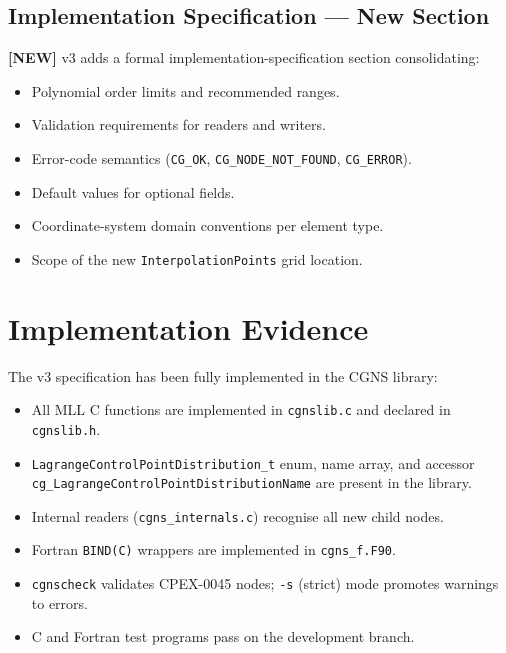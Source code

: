 \documentclass[11pt,letterpaper]{article}
\newcommand{\NEW}{\textcolor{newgreen}{\textbf{[NEW]}}}
\begin{document}
\subsection{Implementation Specification --- New Section}

\NEW{} v3 adds a formal implementation-specification section consolidating:

\begin{itemize}[nosep]
  \item Polynomial order limits and recommended ranges.
  \item Validation requirements for readers and writers.
  \item Error-code semantics (\texttt{CG\_OK}, \texttt{CG\_NODE\_NOT\_FOUND},
    \texttt{CG\_ERROR}).
  \item Default values for optional fields.
  \item Coordinate-system domain conventions per element type.
  \item Scope of the new \texttt{InterpolationPoints} grid location.
\end{itemize}

\section{Implementation Evidence}

The v3 specification has been fully implemented in the CGNS library:

\begin{itemize}[nosep]
  \item All MLL C functions are implemented in \texttt{cgnslib.c} and declared in
    \texttt{cgnslib.h}.
  \item \texttt{LagrangeControlPointDistribution\_t} enum, name array, and accessor
    \texttt{cg\_LagrangeControlPointDistributionName} are present in the library.
  \item Internal readers (\texttt{cgns\_internals.c}) recognise all new child nodes.
  \item Fortran \texttt{BIND(C)} wrappers are implemented in \texttt{cgns\_f.F90}.
  \item \texttt{cgnscheck} validates CPEX-0045 nodes; \texttt{-s} (strict) mode promotes
    warnings to errors.
  \item C and Fortran test programs pass on the development branch.
\end{itemize}
\end{document}
